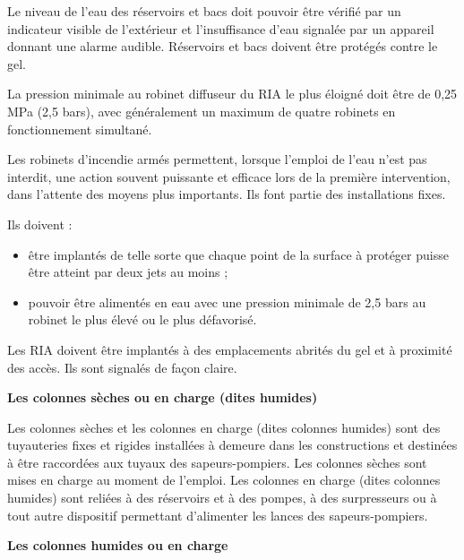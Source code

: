 Le niveau de l’eau des réservoirs et bacs doit pouvoir être vérifié par un indicateur visible de l’extérieur et l’insuffisance d’eau signalée par un appareil donnant une alarme audible. Réservoirs et bacs doivent être protégés contre le gel.
\vspace{0.3cm}

La pression minimale au robinet diffuseur du RIA le plus éloigné doit être de 0,25 MPa (2,5 bars), avec généralement un maximum de quatre robinets en fonctionnement simultané.
\vspace{0.3cm}

Les robinets d’incendie armés permettent, lorsque l’emploi de l’eau n’est pas interdit, une action souvent puissante et efficace lors de la première intervention, dans l’attente des moyens plus importants. Ils font partie des installations fixes. 
\vspace{0.3cm}

Ils doivent :

\begin{itemize}
\item  être implantés de telle sorte que chaque point de la surface à protéger puisse être atteint par deux jets au moins ;
\item  pouvoir être alimentés en eau avec une pression minimale de 2,5 bars au robinet le plus élevé ou le plus défavorisé.

\end{itemize} 

Les RIA doivent être implantés à des emplacements abrités du gel et à proximité des accès. Ils sont signalés de façon claire.

\vspace{0,3cm}
\textbf{Les colonnes sèches ou en charge (dites humides)}
\vspace{0,3cm}

Les colonnes sèches et les colonnes en charge (dites colonnes humides) sont des tuyauteries fixes et rigides installées à demeure dans les constructions et destinées à être raccordées aux tuyaux des sapeurs-pompiers.
Les colonnes sèches sont mises en charge au moment de l’emploi.
Les colonnes en charge (dites colonnes humides) sont reliées à des réservoirs et à des pompes, à des surpresseurs ou à tout autre dispositif permettant d’alimenter les lances des sapeurs-pompiers.



\vspace{0.3cm}
\textbf{Les colonnes humides ou en charge}
\vspace{0.3cm}



